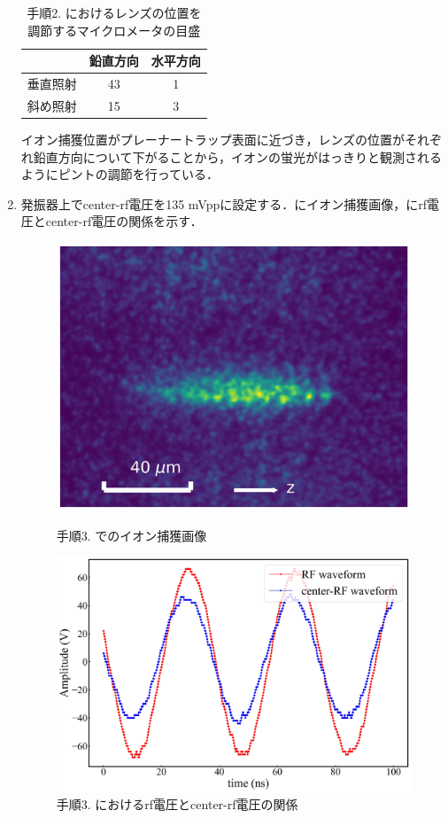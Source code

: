 \begin{enumerate}
\begin{table}[h]
\begin{center}
	\caption{手順2. におけるレンズの位置を調節するマイクロメータの目盛}
	\label{tab:2_2D}
	\begin{tabular}{c|cc} \hline \hline
		&鉛直方向&水平方向 \\ \hline
		垂直照射&43 & 1 \\ 
		斜め照射&15 & 3 \\ \hline
	\end{tabular}
\end{center}
\end{table}

イオン捕獲位置がプレーナートラップ表面に近づき，レンズの位置がそれぞれ鉛直方向について下がることから，イオンの蛍光がはっきりと観測されるようにピントの調節を行っている．
\item 発振器上でcenter-rf電圧を135 mVppに設定する．にイオン捕獲画像，にrf電圧とcenter-rf電圧の関係を示す．

\begin{figure}[h]
	\begin{minipage}{0.48\linewidth}
	\begin{center}
		\includegraphics[width = 0.6\columnwidth]{./methods/figure/3_2D.jpg}
		\caption{手順3. でのイオン捕獲画像}
		\label{fig:3_2D}
	\end{center}
	\end{minipage}
	\begin{minipage}{0.48\linewidth}
		\begin{center}
			\includegraphics[width = 0.9\columnwidth]{./methods/figure/3_2D_wave.jpg}
			\caption{手順3. におけるrf電圧とcenter-rf電圧の関係}
			\label{fig:3_2D_wave}
		\end{center}
	\end{minipage}
\end{figure}


\end{enumerate}
